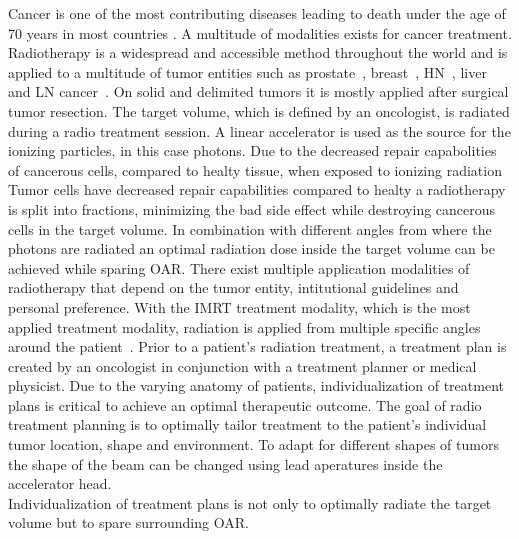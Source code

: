 Cancer is one of the most contributing diseases leading to death under the age of 70 years in most countries \cite{bray_everincreasing_2021}. 
A multitude of modalities exists for cancer treatment. 
Radiotherapy is a widespread and accessible method throughout the world \cite{shahzad_overview_2018} and is applied to a multitude of tumor entities such as prostate~\cite{geinitz_3d_2005, nguyen_curative_2005, budiharto_external_nodate}, breast~\cite{ragaz_adjuvant_1997, lena_combined_nodate, taylor_estimating_2017}, \ac{HN}~\cite{datta_head_1990, bhide_advances_2010, castadot_adaptive_2010, morgan_adaptive_2020}, liver~\cite{hoyer_radiotherapy_2012, wulf_stereotactic_2001, wulf_stereotactic_2006, sterzing_stereotactic_2014, witt_mri-guided_2020} and \ac{LN} cancer~\cite{degro_degro_2014, matsushita_stereotactic_2018, mikell_postoperative_2015, lundstedt_long-term_2012, jereczek-fossa_is_2015}.
On solid and delimited tumors it is mostly applied after surgical tumor resection.
The target volume, which is defined by an oncologist, is radiated during a radio treatment session.
A linear accelerator is used as the source for the ionizing particles, in this case photons.
Due to the decreased repair capabolities of cancerous cells, compared to healty tissue, when exposed to ionizing radiation Tumor cells have decreased repair capabilities compared to healty a radiotherapy is split into fractions, minimizing the bad side effect while destroying cancerous cells in the target volume.
In combination with different angles from where the photons are radiated an optimal radiation dose inside the target volume can be achieved while sparing \ac{OAR}. 
There exist multiple application modalities of radiotherapy that depend on the tumor entity, intitutional guidelines and personal preference.
With the \ac{IMRT} treatment modality, which is the most applied treatment modality, radiation is applied from multiple specific angles around the patient~\cite{cho_intensity-modulated_2018}.
Prior to a patient's radiation treatment, a treatment plan is created by an oncologist in conjunction with a treatment planner or medical physicist.
Due to the varying anatomy of patients, individualization of treatment plans is critical to achieve an optimal therapeutic outcome. 
The goal of radio treatment planning is to optimally tailor treatment to the patient's individual tumor location, shape and environment.
To adapt for different shapes of tumors the shape of the beam can be changed using lead aperatures inside the accelerator head.\\
Individualization of treatment plans is not only to optimally radiate the target volume but to spare surrounding \ac{OAR}.
